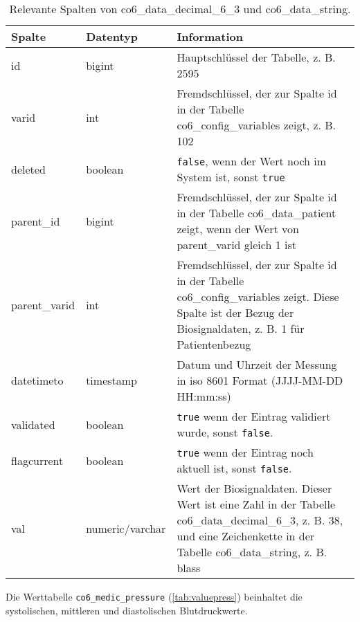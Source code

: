 \begin{longtable}{|l|l|p{7cm}|}
	\caption[Relevante Spalten von co6\_data\_decimal\_6\_3 und \\ co6\_data\_string]{Relevante Spalten von co6\_data\_decimal\_6\_3 und co6\_data\_string.}
	\label{tab:valuetab}
	\endfirsthead
		\hline
		\bfseries Spalte & \bfseries Datentyp & \bfseries Information \\ \hline
		id & bigint & Hauptschlüssel der Tabelle, z. B. 2595 \\ \hline
		varid & int & Fremdschlüssel, der zur Spalte id in der Tabelle co6\_config\_variables zeigt, z. B. 102 \\ \hline
		deleted & boolean & \texttt{false}, wenn der Wert noch im System ist, sonst \texttt{true} \\ \hline
		parent\_id & bigint & Fremdschlüssel, der zur Spalte id in der Tabelle co6\_data\_patient zeigt, wenn der Wert von parent\_varid gleich 1 ist \\ \hline
		parent\_varid & int & Fremdschlüssel, der zur Spalte id in der Tabelle co6\_config\_variables zeigt. Diese Spalte ist der Bezug der Biosignaldaten, z. B. 1 für Patientenbezug \\ \hline
		datetimeto & timestamp & Datum und Uhrzeit der Messung in \acs{iso} 8601 Format (JJJJ-MM-DD HH:mm:ss)\\ \hline
		validated & boolean & \texttt{true} wenn der Eintrag validiert wurde, sonst \texttt{false}. \\ \hline
		flagcurrent & boolean & \texttt{true} wenn der Eintrag noch aktuell ist, sonst \texttt{false}. \\ \hline
		val & numeric/varchar & Wert der Biosignaldaten. Dieser Wert ist eine Zahl in der Tabelle co6\_data\_decimal\_6\_3, z. B. 38, und eine Zeichenkette in der Tabelle co6\_data\_string, z. B. blass \\ \hline
\end{longtable}

Die Werttabelle \texttt{co6\_medic\_pressure} (\ref{tab:valuepress}) beinhaltet die systolischen, mittleren und diastolischen Blutdruckwerte.


